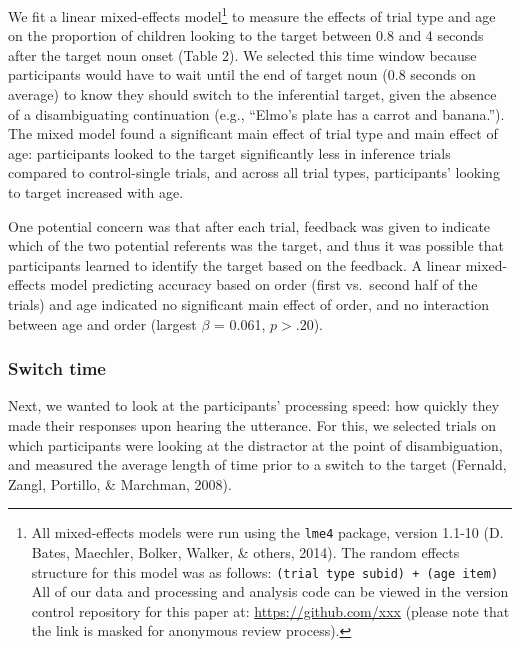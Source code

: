 \documentclass[a4paper,man,apacite,floatsintext]{apa6}
\begin{document}
We fit a linear mixed-effects model\footnote{All mixed-effects models
  were run using the \texttt{lme4} package, version 1.1-10 (D. Bates,
  Maechler, Bolker, Walker, \& others, 2014). The random effects
  structure for this model was as follows:
  \texttt{(trial type \textbar{} subid) + (age \textbar{} item)} All of
  our data and processing and analysis code can be viewed in the version
  control repository for this paper at: \url{https://github.com/xxx}
  (please note that the link is masked for anonymous review process).}
to measure the effects of trial type and age on the proportion of
children looking to the target between 0.8 and 4 seconds after the
target noun onset (Table 2). We selected this time window because
participants would have to wait until the end of target noun (0.8
seconds on average) to know they should switch to the inferential
target, given the absence of a disambiguating continuation (e.g.,
``Elmo's plate has a carrot and banana.''). The mixed model found a
significant main effect of trial type and main effect of age:
participants looked to the target significantly less in inference trials
compared to control-single trials, and across all trial types,
participants' looking to target increased with age.

One potential concern was that after each trial, feedback was given to
indicate which of the two potential referents was the target, and thus
it was possible that participants learned to identify the target based
on the feedback. A linear mixed-effects model predicting accuracy based
on order (first vs.~second half of the trials) and age indicated no
significant main effect of order, and no interaction between age and
order (largest \(\beta\) = 0.061, \(p >.20\)).

\subsubsection{Switch time}\label{switch-time}

Next, we wanted to look at the participants' processing speed: how
quickly they made their responses upon hearing the utterance. For this,
we selected trials on which participants were looking at the distractor
at the point of disambiguation, and measured the average length of time
prior to a switch to the target (Fernald, Zangl, Portillo, \& Marchman,
2008).
\end{document}
